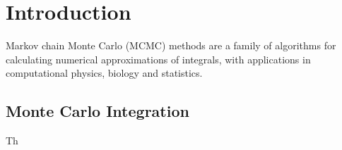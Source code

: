 	\section{Introduction}
	Markov chain Monte Carlo (MCMC) methods are a family of algorithms for calculating numerical approximations of integrals, with applications in computational physics, biology and statistics.  
	
	\subsection*{Monte Carlo Integration}
	Th
		
	
	


